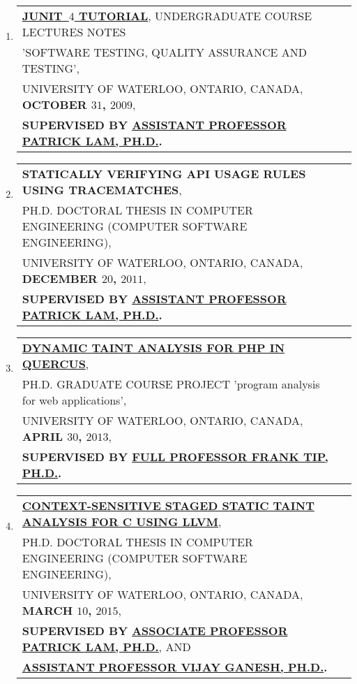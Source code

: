 \documentclass[9pt,a4paper]{article} %
\makeatletter
\newcommand{\headerrow}[2]
{\begin{tabular*}{\linewidth}{l@{\extracolsep{\fill}}r}
	#1 &
	#2 \\
\end{tabular*}}
\newcommand{\headerrowONE}[1]{\headerrow{#1}{}}
\makeatother
\begin{document}
\begin{enumerate}
\item \headerrowONE{\href{http://archive.org/details/junit-by-xavier-noumbissi-noundou}{
	\textbf{JUNIT~$4$ TUTORIAL}}, UNDERGRADUATE COURSE LECTURES NOTES \\
	'SOFTWARE TESTING, QUALITY ASSURANCE AND TESTING',\\
	UNIVERSITY OF WATERLOO, ONTARIO, CANADA, \textbf{OCTOBER $31$, $2009$},\\
	\textbf{SUPERVISED BY \href{http://patricklam.ca}{ASSISTANT PROFESSOR PATRICK LAM, PH.D.}.}}
 
\item \headerrowONE{\textbf{STATICALLY VERIFYING API USAGE RULES USING TRACEMATCHES},\\
	PH.D. DOCTORAL THESIS IN COMPUTER ENGINEERING (COMPUTER SOFTWARE ENGINEERING),\\
	UNIVERSITY OF WATERLOO, ONTARIO, CANADA, \textbf{DECEMBER $20$, $2011$},\\
	\textbf{SUPERVISED BY \href{http://patricklam.ca}{ASSISTANT PROFESSOR PATRICK LAM, PH.D.}.}}

\item \headerrowONE{\href{http://archive.org/details/cs846-nnoumbissi}{
	\textbf{DYNAMIC TAINT ANALYSIS FOR PHP IN QUERCUS}},\\
	PH.D. GRADUATE COURSE PROJECT 'program analysis for web applications',\\
UNIVERSITY OF WATERLOO, ONTARIO, CANADA, \textbf{APRIL $30$, $2013$},\\
	\textbf{SUPERVISED BY \href{http://www.franktip.org}{FULL PROFESSOR FRANK TIP, PH.D.}.}}


\item \headerrowONE{\href{http://archive.org/details/saint_201507}{
	\textbf{CONTEXT-SENSITIVE STAGED STATIC TAINT ANALYSIS FOR C USING LLVM}},\\
	PH.D. DOCTORAL THESIS IN COMPUTER ENGINEERING (COMPUTER SOFTWARE ENGINEERING),\\
	UNIVERSITY OF WATERLOO, ONTARIO, CANADA, \textbf{MARCH $10$, $2015$},\\
	\textbf{SUPERVISED BY \href{http://patricklam.ca}{ASSOCIATE PROFESSOR PATRICK LAM, PH.D.}}, AND\\
	\textbf{\href{http://ece.uwaterloo.ca/~vganesh}{ASSISTANT PROFESSOR VIJAY GANESH, PH.D.}.}}
\end{enumerate}
	
\end{document}
